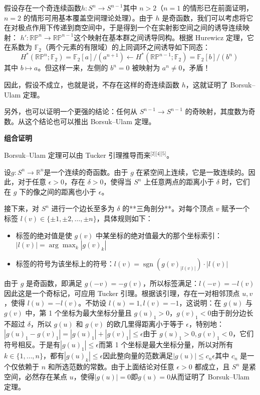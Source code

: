 假设存在一个奇连续函数$h : S^n \to S^{n-1}$其中 $n > 2$（$n=1$ 的情形已在前面证明，$n=2$ 的情形可用基本覆盖空间理论处理）。由于 $h$ 是奇函数，我们可以考虑将它在对极点作用下传递到商空间中，于是得到一个在实射影空间之间的诱导连续映射：
$h' : \mathbb{RP}^n \to \mathbb{RP}^{n-1}$这个映射在基本群之间诱导同构。根据 Hurewicz 定理，它在系数为 $\mathbb{F}_2$（两个元素的有限域）的上同调环之间诱导如下同态：
$$
H^*(\mathbb{RP}^n; \mathbb{F}_2) = \mathbb{F}_2[a]/(a^{n+1}) \leftarrow H^*(\mathbb{RP}^{n-1}; \mathbb{F}_2) = \mathbb{F}_2[b]/(b^n)~
$$
其中 $b \mapsto a$。但这样一来，左侧的 $b^n = 0$ 被映射为 $a^n \neq 0$，矛盾！

因此，假设不成立，也就是说，不存在这样的奇连续函数 $h$，这就证明了 Borsuk–Ulam 定理。

另外，也可以证明一个更强的结论：任何从 $S^{n-1} \to S^{n-1}$ 的奇映射，其度数为奇数。从这个结论也可以推出 Borsuk–Ulam 定理。

\textbf{组合证明}

Borsuk–Ulam 定理可以由 Tucker 引理推导而来\(^\text{[2][4][5]}\)。

设$g : S^n \to \mathbb{R}^n$是一个连续的奇函数。由于 $g$ 在紧空间上连续，它是一致连续的。因此，对于任意 $\epsilon > 0$，存在 $\delta > 0$，使得当 $S^n$ 上任意两点的距离小于 $\delta$ 时，它们在 $g$ 下的像之间的距离也小于 $\epsilon$。

接下来，对 $S^n$ 进行一个边长至多为 $\delta$ 的**三角剖分**。对每个顶点 $v$ 赋予一个标签 $l(v) \in \{\pm 1, \pm 2, \dots, \pm n\}$，具体规则如下：
\begin{itemize}
\item 标签的绝对值是使 $g(v)$ 中某坐标的绝对值最大的那个坐标索引：$|l(v)| = \arg \max_k |g(v)_k|$
\item 标签的符号为该坐标上的符号：$l(v) = \operatorname{sgn}(g(v)_{|l(v)|}) \cdot |l(v)|$
\end{itemize}
由于 $g$ 是奇函数，即满足 $g(-v) = -g(v)$，所以标签满足：$l(-v) = -l(v)$因此这是一个奇标记，可应用 Tucker 引理。根据该引理，存在一对相邻顶点 $u, v$，使得 $l(u) = -l(v)$。不妨设 $l(u) = 1, l(v) = -1$，这说明：在 $g(u)$ 与 $g(v)$ 中，第 1 个坐标为最大坐标分量且 $g(u)_1 > 0$，$g(v)_1 < 0$由于剖分边长不超过 $\delta$，所以 $g(u)$ 和 $g(v)$ 的欧几里得距离小于等于 $\epsilon$，特别地：$|g(u)_1 - g(v)_1| = |g(u)_1| + |g(v)_1| \leq \epsilon$由于 $g(u)_1 > 0, g(v)_1 < 0$，它们符号相反。于是有$|g(u)_1| \leq \epsilon$而第 1 个坐标是最大坐标分量，所以对所有 $k \in \{1, \dots, n\}$，都有$|g(u)_k| \leq \epsilon$因此整向量的范数满足$|g(u)| \leq c_n \epsilon$其中 $c_n$ 是一个仅依赖于 $n$ 和所选范数的常数。由于上面结论对任意 $\epsilon > 0$ 都成立，且 $S^n$ 是紧空间，必然存在某点 $u$，使得$|g(u)| = 0$即$g(u) = 0$从而证明了 Borsuk–Ulam 定理。
